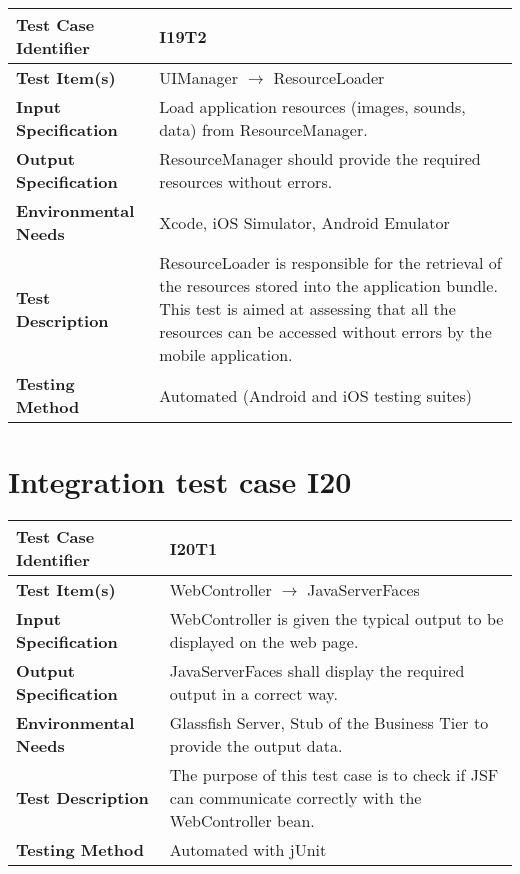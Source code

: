 \vspace{2em}

\noindent\begin{tabular}{l p{}}
    \hline
    \textbf{Test Case Identifier} & I19T2\\
    \hline
    \textbf{Test Item(s)} & UIManager $\rightarrow$ ResourceLoader \\
    \hline
    \textbf{Input Specification} & Load application resources (images, sounds, data) from ResourceManager. \\
    \hline
    \textbf{Output Specification} & ResourceManager should provide the required resources without errors. \\
    \hline
    \textbf{Environmental Needs} & Xcode, iOS Simulator, Android Emulator\\
    \hline
    \textbf{Test Description} & ResourceLoader is responsible for the retrieval of the resources stored into the application bundle.
    This test is aimed at assessing that all the resources can be accessed without errors by the mobile application. \\
    \hline
    \textbf{Testing Method} & Automated (Android and iOS testing suites) \\
    \hline
\end{tabular}

\vspace{2em}

\section{Integration test case I20}

\begin{tabular}{l p{}}
    \hline
    \textbf{Test Case Identifier} & I20T1\\
    \hline
    \textbf{Test Item(s)} & WebController $\rightarrow$ JavaServerFaces \\
    \hline
    \textbf{Input Specification} & WebController is given the typical output to be displayed on the web page.\\
    \hline
    \textbf{Output Specification} & JavaServerFaces shall display the required output in a correct way.\\
    \hline
    \textbf{Environmental Needs} & Glassfish Server, Stub of the Business Tier to provide the output data. \\
    \hline
    \textbf{Test Description} & The purpose of this test case is to check if JSF can communicate correctly with the WebController bean.\\
    \hline
    \textbf{Testing Method} & Automated with jUnit \\
    \hline
\end{tabular}

